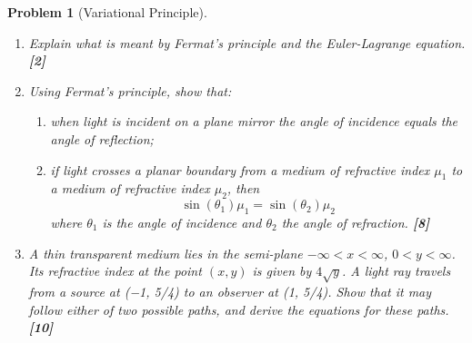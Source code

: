 \documentclass[a4paper]{article}
\theoremstyle{new}
\newtheorem{qns}{Problem}[section]
\begin{document}
\newpage
\begin{qns}[Variational Principle]\leavevmode
\begin{enumerate}[label=(\alph*)]
\item Explain what is meant by Fermat’s principle and the Euler-Lagrange equation. \hfill\textbf{[2]}
\item Using Fermat’s principle, show that:
\begin{enumerate}[label=(\roman*)]
\item
when light is incident on a plane mirror the angle of incidence equals the angle of reflection;
\item if light crosses a planar boundary from a medium of refractive index $\mu_1$ to a medium of refractive index $\mu_2$, then
$$\sin(\theta_1)\mu_1=\sin(\theta_2)\mu_2$$
where $\theta_1$ is the angle of incidence and $\theta_2$ the angle of refraction. \hfill\textbf{[8]}
\end{enumerate}
\item A thin transparent medium lies in the semi-plane $−\infty < x < \infty$, $0 < y < \infty$. Its refractive index at the point $(x, y)$ is given by $4\sqrt{y}$. A light ray travels from a source at (−1, 5/4) to an observer at (1, 5/4). Show that it may follow either of two possible paths, and derive the equations for these paths.\hfill\textbf{[10]}
\end{enumerate}
\end{qns}
\end{document}
